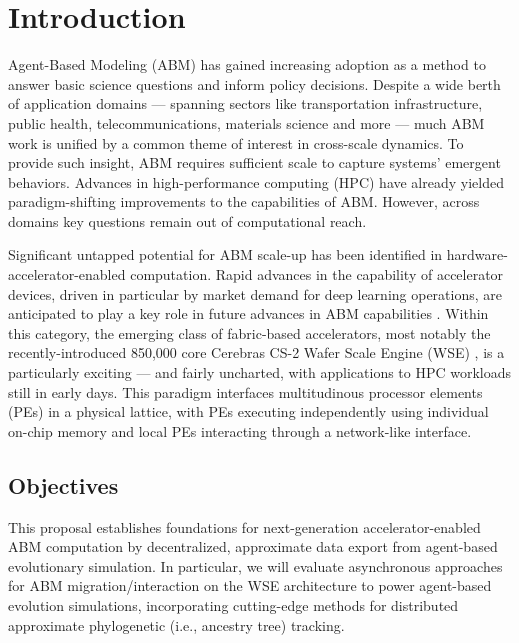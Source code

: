 \section{Introduction} \label{sec:introduction}

Agent-Based Modeling (ABM) has gained increasing adoption as a method to answer basic science questions and inform policy decisions.
Despite a wide berth of application domains --- spanning sectors like transportation infrastructure, public health, telecommunications, materials science and more --- much ABM work is unified by a common theme of interest in cross-scale dynamics.
To provide such insight, ABM requires sufficient scale to capture systems' emergent behaviors.
Advances in high-performance computing (HPC) have already yielded paradigm-shifting improvements to the capabilities of ABM.
However, across domains key questions remain out of computational reach.


Significant untapped potential for ABM scale-up has been identified in hardware-accelerator-enabled computation.
Rapid advances in the capability of accelerator devices, driven in particular by market demand for deep learning operations, are anticipated to play a key role in future advances in ABM capabilities \citep{perumalla2022computer}.
Within this category, the emerging class of fabric-based accelerators, most notably the recently-introduced 850,000 core Cerebras CS-2 Wafer Scale Engine (WSE) \citep{lauterbach2021path,lie2022cerebras}, is a particularly exciting --- and fairly uncharted, with applications to HPC workloads still in early days.
This paradigm interfaces multitudinous processor elements (PEs) in a physical lattice, with PEs executing independently using individual on-chip memory and local PEs interacting through a network-like interface.

\subsection{Objectives}

This proposal establishes foundations for next-generation accelerator-enabled ABM computation by decentralized, approximate data export from agent-based evolutionary simulation.
In particular, we will evaluate asynchronous approaches for ABM migration/interaction on the WSE architecture to power agent-based evolution simulations, incorporating cutting-edge methods for distributed approximate phylogenetic (i.e., ancestry tree) tracking.

